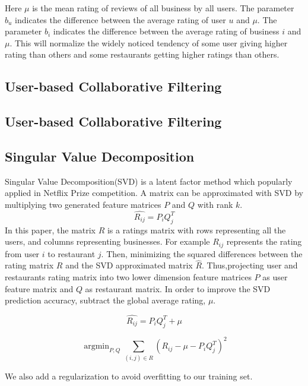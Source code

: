 \documentclass{llncs}
\DeclareMathOperator*{\argmin}{argmin}
\begin{document}
Here $\mu$ is the mean rating of reviews of all business by all users. The parameter $b_u$ indicates the difference between the average rating of user $u$ and $\mu$. The parameter $b_i$ indicates the difference between the average rating of business $i$ and $\mu$. This will normalize the widely noticed tendency of some user giving higher rating than others and some restaurants getting higher ratings than others.


\subsection{User-based Collaborative Filtering}

\subsection{User-based Collaborative Filtering}

\subsection{Singular Value Decomposition}
Singular Value Decomposition(SVD) is a latent factor method which popularly applied in Netflix Prize competition. A matrix can be approximated with SVD by multiplying two generated feature matrices $P$ and $Q$ with rank $k$.
\begin{equation}
\hat{R_{ij}} = P_iQ_{j}^{T}
\end{equation}
In this paper, the matrix $R$ is a ratings matrix with rows representing all the users, and columns representing businesses. For example $R_{ij}$ represents the rating from user $i$ to restaurant $j$. Then, minimizing the squared differences between the rating matrix $R$ and the SVD approximated matrix $\hat{R}$. Thus,projecting user and restaurants rating matrix into two lower dimension feature matrices $P$ as user feature matrix and $Q$ as restaurant matrix. In order to improve the SVD prediction accuracy, subtract the global average rating, $\mu$.

\begin{equation}
\hat{R_{ij}} = P_iQ_{j}^{T} + \mu
\end{equation}

\begin{equation}
\argmin_{P,Q}\sum_{(i,j)\in{R}}{(R_{ij} - \mu - P_iQ_{j}^{T})}^2
\end{equation}

We also add a regularization to avoid overfitting to our training set.
\end{document}
